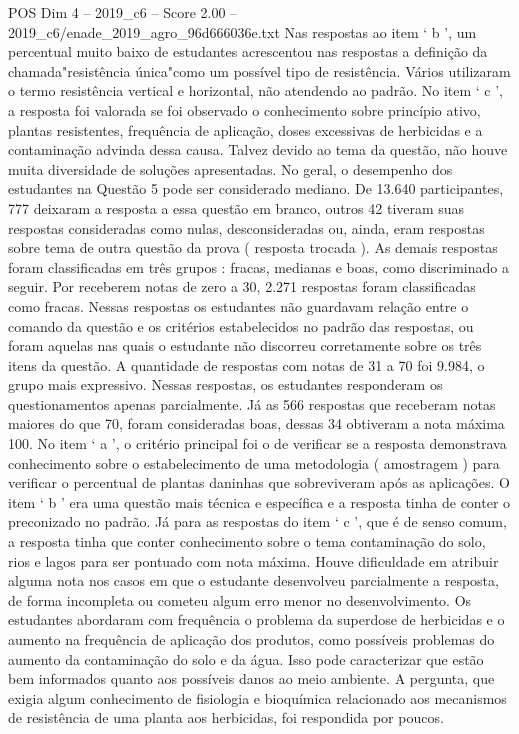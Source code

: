 \begin{textsample}{POS Dim 4 – 2019\_c6 – Score 2.00 – 2019\_c6/enade\_2019\_agro\_96d666036e.txt}
Nas respostas ao item ‘ b ’, um percentual muito baixo de estudantes acrescentou nas respostas a definição da chamada"resistência única"como um possível tipo de resistência.
Vários utilizaram o termo resistência vertical e horizontal, não atendendo ao padrão.
No item ‘ c ’, a resposta foi valorada se foi observado o conhecimento sobre princípio ativo, plantas resistentes, frequência de aplicação, doses excessivas de herbicidas e a contaminação advinda dessa causa.
Talvez devido ao tema da questão, não houve muita diversidade de soluções apresentadas.
No geral, o desempenho dos estudantes na Questão 5 pode ser considerado mediano.
De 13.640 participantes, 777 deixaram a resposta a essa questão em branco, outros 42 tiveram suas respostas consideradas como nulas, desconsideradas ou, ainda, eram respostas sobre tema de outra questão da prova ( resposta trocada ).
As demais respostas foram classificadas em três grupos : fracas, medianas e boas, como discriminado a seguir.
Por receberem notas de zero a 30, 2.271 respostas foram classificadas como fracas.
Nessas respostas os estudantes não guardavam relação entre o comando da questão e os critérios estabelecidos no padrão das respostas, ou foram aquelas nas quais o estudante não discorreu corretamente sobre os três itens da questão.
A quantidade de respostas com notas de 31 a 70 foi 9.984, o grupo mais expressivo.
Nessas respostas, os estudantes responderam os questionamentos apenas parcialmente.
Já as 566 respostas que receberam notas maiores do que 70, foram consideradas boas, dessas 34 obtiveram a nota máxima 100.
No item ‘ a ’, o critério principal foi o de verificar se a resposta demonstrava conhecimento sobre o estabelecimento de uma metodologia ( amostragem ) para verificar o percentual de plantas daninhas que sobreviveram após as aplicações.
O item ‘ b ’ era uma questão mais técnica e específica e a resposta tinha de conter o preconizado no padrão.
Já para as respostas do item ‘ c ’, que é de senso comum, a resposta tinha que conter conhecimento sobre o tema contaminação do solo, rios e lagos para ser pontuado com nota máxima.
Houve dificuldade em atribuir alguma nota nos casos em que o estudante desenvolveu parcialmente a resposta, de forma incompleta ou cometeu algum erro menor no desenvolvimento.
Os estudantes abordaram com frequência o problema da superdose de herbicidas e o aumento na frequência de aplicação dos produtos, como possíveis problemas do aumento da contaminação do solo e da água.
Isso pode caracterizar que estão bem informados quanto aos possíveis danos ao meio ambiente.
A pergunta, que exigia algum conhecimento de fisiologia e bioquímica relacionado aos mecanismos de resistência de uma planta aos herbicidas, foi respondida por poucos.

\end{textsample}
